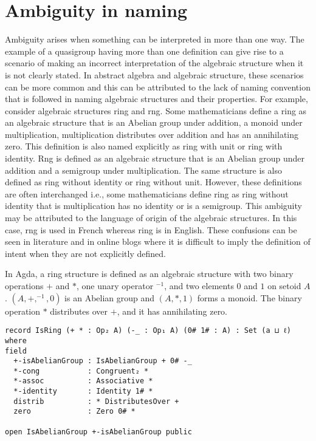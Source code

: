 \section{Ambiguity in naming}
Ambiguity arises when something can be interpreted in more than one way. The
example of a quasigroup having more than one definition can give rise to a
scenario of making an incorrect interpretation of the algebraic structure when
it is not clearly stated. In abstract algebra and algebraic structure, these
scenarios can be more common and this can be attributed to the lack of naming
convention that is followed in naming algebraic structures and their properties.
For example, consider algebraic structures ring and rng. Some mathematicians
define a ring as an algebraic structure that is an Abelian group under addition,
a monoid under multiplication, multiplication distributes over addition and has
an annihilating zero. This definition is also named explicitly as ring with unit
or ring with identity. Rng is defined as an algebraic structure that is an
Abelian group under addition and a semigroup under multiplication. The same
structure is also defined as ring without identity or ring without unit.
However, these definitions are often interchanged i.e., some mathematicians
define ring as ring without identity that is multiplication has no identity or
is a semigroup. This ambiguity may be attributed to the language of origin of
the algebraic structures. In this case, rng is used in French whereas ring is in
English. These confusions can be seen in literature and in online blogs where it
is difficult to imply the definition of intent when they are not explicitly
defined. 

In Agda, a ring structure is defined as an algebraic structure with two binary
operations $+$ and $*$, one unary operator $^{-1}$, and two elements $0$ and $1$
on setoid $A$. $(A,+,^{-1},0)$ is an Abelian group and $(A,*,1)$ forms a monoid.
The binary operation $*$ distributes over $+$, and it has annihilating zero.

\begin{verbatim}
record IsRing (+ * : Op₂ A) (-_ : Op₁ A) (0# 1# : A) : Set (a ⊔ ℓ) where
field
  +-isAbelianGroup : IsAbelianGroup + 0# -_
  *-cong           : Congruent₂ *
  *-assoc          : Associative *
  *-identity       : Identity 1# *
  distrib          : * DistributesOver +
  zero             : Zero 0# *

open IsAbelianGroup +-isAbelianGroup public
\end{verbatim} 

